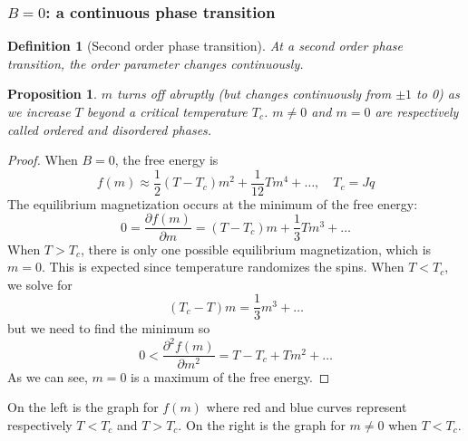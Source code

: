 \documentclass[a4paper]{article}
\theoremstyle{new}
\newtheorem{defi}{Definition}[section]
\newtheorem{prop}{Proposition}[section]
\begin{document}
\subsubsection{$B=0$: a continuous phase transition}
\begin{defi}[Second order phase transition]
At a second order phase transition, the order parameter changes continuously.
\end{defi}
\begin{prop}
$m$ turns off abruptly (but changes continuously from $\pm1$ to 0) as we increase $T$ beyond a critical temperature $T_c$. $m\neq 0$ and $m=0$ are respectively called ordered and disordered phases.
\end{prop}
\begin{proof}
When $B=0$, the free energy is 
$$f(m)\approx\frac{1}{2}(T-T_c)m^2+\frac{1}{12}Tm^4+\dots,\quad T_c=Jq$$
The equilibrium magnetization occurs at the minimum of the free energy:
$$0=\frac{\partial f(m)}{\partial m}=(T-T_c)m+\frac{1}{3}Tm^3+\dots$$
When $T>T_c$, there is only one possible equilibrium magnetization, which is $m=0$. This is expected since temperature randomizes the spins. When $T<T_c$, we solve for
$$(T_c-T)m=\frac{1}{3}m^3+\dots$$
but we need to find the minimum so
$$0<\frac{\partial^2f(m)}{\partial m^2}=T-T_c+Tm^2+\dots$$
As we can see, $m=0$ is a maximum of the free energy.
\end{proof}
On the left is the graph for $f(m)$ where red and blue curves represent respectively $T<T_c$ and $T>T_c$. On the right is the graph for $m\neq 0$ when $T<T_c$. 
\begin{center}
\end{center}
\end{document}
